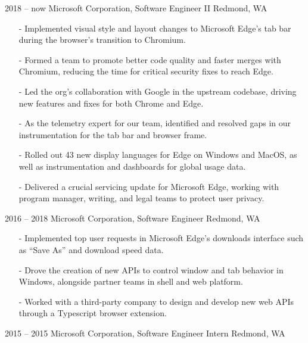\documentclass[print]{template/friggeri-cv}
\begin{document}
    \begin{entrylist}
        \entry
            {2018 -- now}
            {Microsoft Corporation, {\normalfont Software Engineer II}}
            {Redmond, WA}
            {\begin{itemize}[leftmargin=*,itemsep=4pt]
                \item[-] Implemented visual style and layout changes to Microsoft Edge's tab bar during the browser's transition to Chromium.
                \item[-] Formed a team to promote better code quality and faster merges with Chromium, reducing the time for critical security fixes to reach Edge.
                \item[-] Led the org's collaboration with Google in the upstream codebase, driving new features and fixes for both Chrome and Edge.
                \item[-] As the telemetry expert for our team, identified and resolved gaps in our instrumentation for the tab bar and browser frame.
                \item[-] Rolled out 43 new display languages for Edge on Windows and MacOS, as well as instrumentation and dashboards for global usage data.
                \item[-] Delivered a crucial servicing update for Microsoft Edge, working with program manager, writing, and legal teams to protect user privacy.
             \end{itemize}}
        \entry
            {2016 -- 2018}
            {Microsoft Corporation, {\normalfont Software Engineer}}
            {Redmond, WA}
            {\begin{itemize}[leftmargin=*,itemsep=4pt]
                \item[-] Implemented top user requests in Microsoft Edge's downloads interface such as ``Save As'' and download speed data.
                \item[-] Drove the creation of new APIs to control window and tab behavior in Windows, alongside partner teams in shell and web platform.
                \item[-] Worked with a third-party company to design and develop new web APIs through a Typescript browser extension.
             \end{itemize}}
        \entry
            {2015 -- 2015}
            {Microsoft Corporation, {\normalfont Software Engineer Intern}}
            {Redmond, WA}
            {\begin{itemize}[leftmargin=*,itemsep=4pt]

\end{itemize}}
\end{entrylist}
\end{document}
